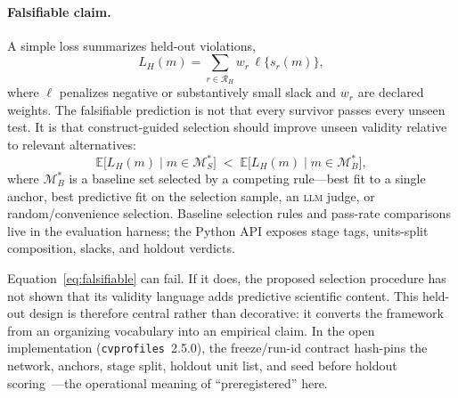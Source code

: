 \documentclass[10pt,letterpaper]{article}
\newcommand{\LLM}{\textsc{llm}}
\newcommand{\cvp}{\texttt{cvprofiles}}
\newcommand{\M}{\ensuremath{\mathcal{M}}}
\newcommand{\E}{\mathbb{E}}
\newcommand{\Rset}{\mathcal{R}}
\begin{document}
\paragraph{Falsifiable claim.}
A simple loss summarizes held-out violations,
\begin{equation}
L_H(m)=\sum_{r\in\Rset_H} w_r\,\ell\bigl\{s_r(m)\bigr\},
\label{eq:LH}
\end{equation}
where $\ell$ penalizes negative or substantively small slack and $w_r$ are declared weights.
The falsifiable prediction is not that every survivor passes every unseen test.
It is that construct-guided selection should improve unseen validity relative to relevant alternatives:
\begin{equation}
\E\bigl[L_H(m)\mid m\in\M^*_S\bigr]
\;<\;
\E\bigl[L_H(m)\mid m\in\M^*_B\bigr],
\label{eq:falsifiable}
\end{equation}
where $\M^*_B$ is a baseline set selected by a competing rule---best fit to a single anchor, best predictive fit on the selection sample, an \LLM{} judge, or random/convenience selection.
Baseline selection rules and pass-rate comparisons live in the evaluation harness; the Python API exposes stage tags, units-split composition, slacks, and holdout verdicts.

Equation~\eqref{eq:falsifiable} can fail.
If it does, the proposed selection procedure has not shown that its validity language adds predictive scientific content.
This held-out design is therefore central rather than decorative: it converts the framework from an organizing vocabulary into an empirical claim.
In the open implementation (\cvp{}~2.5.0), the freeze/run-id contract hash-pins the network, anchors, stage split, holdout unit list, and seed before holdout scoring~\cite{cvprofiles}---the operational meaning of ``preregistered'' here.
\end{document}
